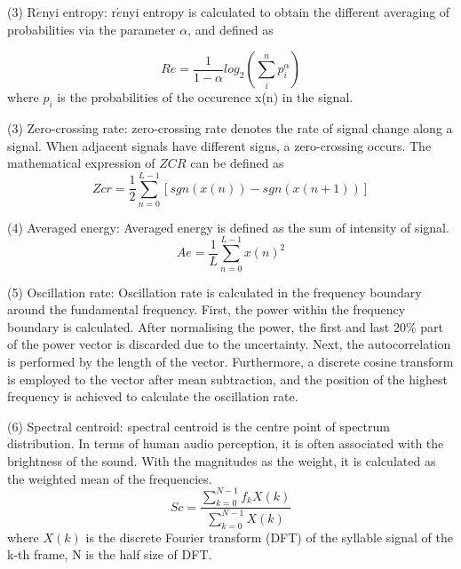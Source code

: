 \vspace{3mm}

\noindent(3) R$\acute{e}$nyi entropy: r$\acute{e}$nyi entropy is calculated to obtain the different averaging of probabilities via the parameter $\alpha$, and defined as

\begin{equation}
Re=\frac{1}{1-\alpha}log_{2}(\sum_{i}^{n}p_{i}^{\alpha})
\end{equation}
where $p_{i}$ is the probabilities of the occurence x(n) in the signal.

\vspace{3mm}

\noindent(3) Zero-crossing rate: zero-crossing rate denotes the rate of signal change along a signal. When adjacent signals have different signs, a zero-crossing occurs. The mathematical expression of $ZCR$ can be defined as
\begin{equation}
Zcr=\frac{1}{2}\sum_{n=0}^{L-1}[sgn(x(n))-sgn(x(n+1))]
\end{equation}

\vspace{3mm}

\noindent(4) Averaged energy: Averaged energy is defined as the sum of intensity of signal.
\begin{equation}
Ae = \frac{1}{L}\sum_{n=0}^{L-1}x(n)^{2}
\end{equation}


\vspace{3mm}
\noindent(5) Oscillation rate: Oscillation rate is calculated in the frequency boundary around the fundamental frequency. First, the power within the frequency boundary is calculated. After normalising the power, the first and last 20\% part of the power vector is discarded due to the uncertainty. Next, the autocorrelation is performed by the length of the vector. Furthermore, a discrete cosine transform is employed to the vector after mean subtraction, and the position of the highest frequency is achieved to calculate the oscillation rate. 





\vspace{3mm}
\noindent(6) Spectral centroid: spectral centroid is the centre point of spectrum distribution. In terms of human audio perception, it is often associated with the brightness of the sound. With the magnitudes as the weight, it is calculated as the weighted mean of the frequencies.
\begin{equation}
Sc=\frac{\sum_{k=0}^{N-1}f_{k}X(k)}{\sum_{k=0}^{N-1}X(k)}
\end{equation}
where $X(k)$ is the discrete Fourier transform (DFT) of the syllable signal of the k-th frame, N is the half size of DFT. 

